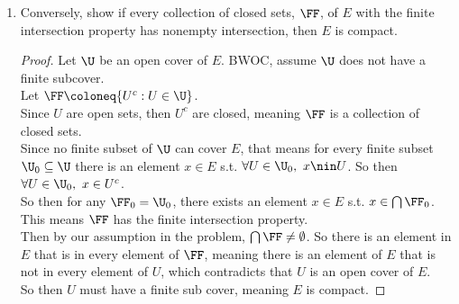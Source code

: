 \documentclass[14pt]{extarticle}
\begin{document}
\begin{enumerate}
\begin{enumerate}
			\item Conversely, show if every collection of closed sets, $\FF$, of $E$ with the finite intersection property has nonempty intersection, then $E$ is compact.
			\begin{proof}
				Let $\U$ be an open cover of $E$. BWOC, assume $\U$ does not have a finite subcover.\\
				Let $\FF\coloneq\{U^c : U \in \U\}$.\\
				Since $U$ are open sets, then $U^c$ are closed, meaning $\FF$ is a collection of closed sets.\\
				Since no finite subset of $\U$ can cover $E$, that means for every finite subset $\U_0\subseteq\U$ there is an element $x\in E$ s.t. $\forall U\in\U_0,\ x\nin U$. So then $\forall U\in\U_0,\ x\in U^c$.\\
				So then for any $\FF_0 = \U_0$, there exists an element $x \in E$ s.t. $x\in \bigcap\FF_0$. This means $\FF$ has the finite intersection property.\\
				Then by our assumption in the problem, $\bigcap\FF\neq\emptyset$. So there is an element in $E$ that is in every element of $\FF$, meaning there is an element of $E$ that is not in every element of $U$, which contradicts that $U$ is an open cover of $E$.\\
				So then $U$ must have a finite sub cover, meaning $E$ is compact.
			\end{proof}
		\end{enumerate}
	\end{enumerate}
\end{document}
